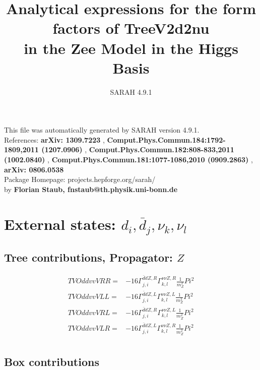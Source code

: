 \documentclass[A4,landscape]{article}
\begin{document}
\title{Analytical expressions for the form factors of TreeV2d2nu\\ in the Zee Model in the Higgs Basis } 
 \author{SARAH 4.9.1} 
 \maketitle 
 \vspace{10cm} 
This file was automatically generated by SARAH version 4.9.1.  \\ 
References: {\bf arXiv: 1309.7223 }, {\bf Comput.Phys.Commun.184:1792-1809,2011 (1207.0906) }, {\bf Comput.Phys.Commun.182:808-833,2011 (1002.0840) }, {\bf Comput.Phys.Commun.181:1077-1086,2010 (0909.2863) }, {\bf arXiv: 0806.0538 } \\ 
Package Homepage: projects.hepforge.org/sarah/ \\ 
by {\bf Florian Staub, fnstaub@th.physik.uni-bonn.de} 
 \pagebreak 
 \tableofcontents 
 \pagebreak 
\section{External states: ${d_{{i}}, \bar{d}_{{j}}, \nu_{{k}}, \nu_{{l}}}$} 
\subsection{Tree contributions, Propagator: $Z$} 

\begin{align} 
  TVOddvvVRR= & -16 \Gamma^{\bar{d}d Z ,R}_{j, i} \Gamma^{\nu \nu Z ,R}_{k, l} \frac{1}{m^2_{Z}} Pi^2 \\ 
  TVOddvvVLL= & -16 \Gamma^{\bar{d}d Z ,L}_{j, i} \Gamma^{\nu \nu Z ,L}_{k, l} \frac{1}{m^2_{Z}} Pi^2 \\ 
  TVOddvvVRL= & -16 \Gamma^{\bar{d}d Z ,R}_{j, i} \Gamma^{\nu \nu Z ,L}_{k, l} \frac{1}{m^2_{Z}} Pi^2 \\ 
  TVOddvvVLR= & -16 \Gamma^{\bar{d}d Z ,L}_{j, i} \Gamma^{\nu \nu Z ,R}_{k, l} \frac{1}{m^2_{Z}} Pi^2 \\ 
\end{align} 
\subsection{Box contributions} 
\end{document}
